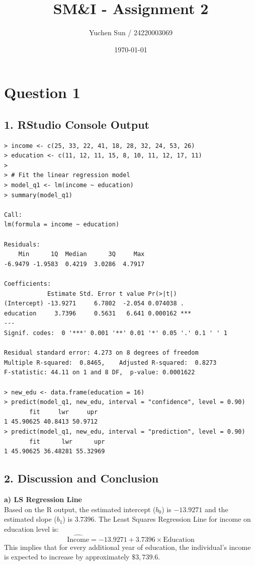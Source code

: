 \documentclass[11pt, a4paper]{article}
\title{\textbf{SM\&I - Assignment 2}}
\author{Yuchen Sun / 24220003069}
\date{\today}
\begin{document}
\maketitle

\section*{Question 1}

\subsection*{1. RStudio Console Output}
\begin{lstlisting}
> income <- c(25, 33, 22, 41, 18, 28, 32, 24, 53, 26)
> education <- c(11, 12, 11, 15, 8, 10, 11, 12, 17, 11)
> 
> # Fit the linear regression model
> model_q1 <- lm(income ~ education)
> summary(model_q1)

Call:
lm(formula = income ~ education)

Residuals:
    Min      1Q  Median      3Q     Max 
-6.9479 -1.9583  0.4219  3.0286  4.7917 

Coefficients:
            Estimate Std. Error t value Pr(>|t|)    
(Intercept) -13.9271     6.7802  -2.054 0.074038 .  
education     3.7396     0.5631   6.641 0.000162 ***
---
Signif. codes:  0 '***' 0.001 '**' 0.01 '*' 0.05 '.' 0.1 ' ' 1

Residual standard error: 4.273 on 8 degrees of freedom
Multiple R-squared:  0.8465,	Adjusted R-squared:  0.8273 
F-statistic: 44.11 on 1 and 8 DF,  p-value: 0.0001622

> new_edu <- data.frame(education = 16)
> predict(model_q1, new_edu, interval = "confidence", level = 0.90)
       fit     lwr     upr
1 45.90625 40.8413 50.9712
> predict(model_q1, new_edu, interval = "prediction", level = 0.90)
       fit      lwr      upr
1 45.90625 36.48281 55.32969
\end{lstlisting}

\subsection*{2. Discussion and Conclusion}

\textbf{a) LS Regression Line}\\
Based on the R output, the estimated intercept ($b_0$) is $-13.9271$ and the estimated slope ($b_1$) is $3.7396$. The Least Squares Regression Line for income on education level is:
\[ \widehat{\text{Income}} = -13.9271 + 3.7396 \times \text{Education} \]
This implies that for every additional year of education, the individual's income is expected to increase by approximately $\$3,739.6$.
\end{document}
